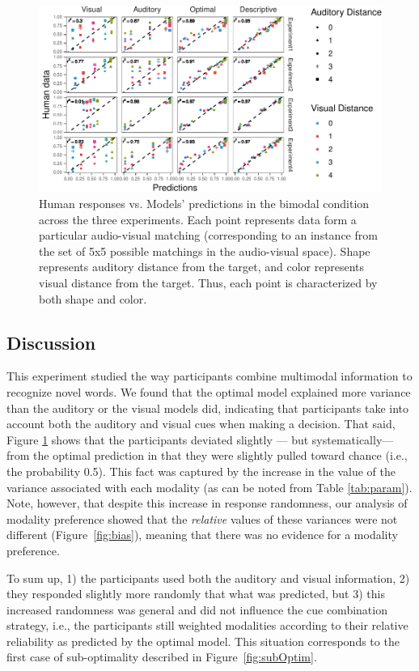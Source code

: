 \documentclass[english,,man,floatsintext]{apa6}
\theoremstyle{definition}
\theoremstyle{definition}
\theoremstyle{definition}
\theoremstyle{remark}
\begin{document}
\begin{figure}[!h]
\includegraphics[width=\textwidth]{ms_files/figure-latex/bimodal-1} \caption{Human responses vs. Models' predictions in the bimodal condition across the three experiments. Each point represents data form a particular audio-visual matching (corresponding to an instance from the set of 5x5 possible matchings in the audio-visual space). Shape represents auditory distance from the target, and color represents visual distance from the target. Thus, each point is characterized by both  shape and color.}\label{fig:bimodal}
\end{figure}

\subsection{Discussion}\label{discussion}

This experiment studied the way participants combine multimodal
information to recognize novel words. We found that the optimal model
explained more variance than the auditory or the visual models did,
indicating that participants take into account both the auditory and
visual cues when making a decision. That said, Figure \ref{fig:bimodal}
shows that the participants deviated slightly --- but systematically---
from the optimal prediction in that they were slightly pulled toward
chance (i.e., the probability 0.5). This fact was captured by the
increase in the value of the variance associated with each modality (as
can be noted from Table \ref{tab:param}). Note, however, that despite
this increase in response randomness, our analysis of modality
preference showed that the \emph{relative} values of these variances
were not different (Figure~\ref{fig:bias}), meaning that there was no
evidence for a modality preference.

To sum up, 1) the participants used both the auditory and visual
information, 2) they responded slightly more randomly that what was
predicted, but 3) this increased randomness was general and did not
influence the cue combination strategy, i.e., the participants still
weighted modalities according to their relative reliability as predicted
by the optimal model. This situation corresponds to the first case of
sub-optimality described in Figure~\ref{fig:subOptim}.
\end{document}
